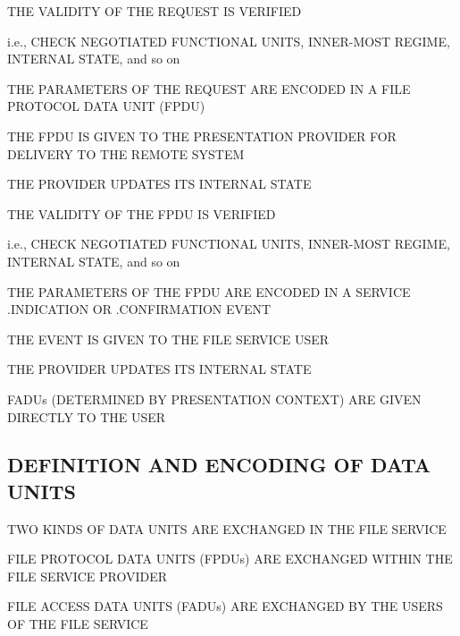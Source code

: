 \begin{bwslide}

\begin{nrtc}
\item	THE VALIDITY OF THE REQUEST IS VERIFIED
    \begin{nrtc}
    \item	i.e., CHECK NEGOTIATED FUNCTIONAL UNITS, INNER-MOST REGIME,
		INTERNAL STATE, and so on
    \end{nrtc}

\item	THE PARAMETERS OF THE REQUEST ARE ENCODED IN A
	FILE PROTOCOL DATA UNIT (FPDU)

\item	THE FPDU IS GIVEN TO THE PRESENTATION PROVIDER FOR DELIVERY
	TO THE REMOTE SYSTEM

\item	THE PROVIDER UPDATES ITS INTERNAL STATE
\end{nrtc}
\end{bwslide}


\begin{bwslide}

\begin{nrtc}
\item	THE VALIDITY OF THE FPDU IS VERIFIED
    \begin{nrtc}
    \item	i.e., CHECK NEGOTIATED FUNCTIONAL UNITS, INNER-MOST REGIME,
		INTERNAL STATE,	and so on
    \end{nrtc}

\item	THE PARAMETERS OF THE FPDU ARE ENCODED IN A SERVICE .INDICATION
	OR .CONFIRMATION EVENT

\item	THE EVENT IS GIVEN TO THE FILE SERVICE USER

\item	THE PROVIDER UPDATES ITS INTERNAL STATE

\item	FADUs (DETERMINED BY PRESENTATION CONTEXT) ARE GIVEN DIRECTLY TO THE
	USER
\end{nrtc}
\end{bwslide}


\begin{bwslide}
\part*	{DEFINITION AND ENCODING OF DATA UNITS}\bf

\begin{nrtc}
\item	TWO KINDS OF DATA UNITS ARE EXCHANGED IN THE FILE SERVICE

\item	FILE PROTOCOL DATA UNITS (FPDUs) ARE EXCHANGED WITHIN THE
	FILE SERVICE PROVIDER

\item	FILE ACCESS DATA UNITS (FADUs) ARE EXCHANGED BY THE USERS OF THE
	FILE SERVICE
\end{nrtc}
\end{bwslide}



